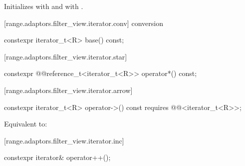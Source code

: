 \begin{itemdescr}
\pnum
\effects Initializes  with  and 
with .
\end{itemdescr}

[range.adaptors.filter_view.iterator.conv]{ conversion}

%
\begin{itemdecl}
constexpr iterator_t<R> base() const;
\end{itemdecl}

\begin{itemdescr}
\pnum
\oldtxt{\returns}  
\end{itemdescr}

[range.adaptors.filter_view.iterator.star]{}

%
\begin{itemdecl}
constexpr @@reference_t<iterator_t<R>> operator*() const;
\end{itemdecl}

\begin{itemdescr}
\pnum
\oldtxt{\returns} 
\end{itemdescr}

{\color{newclr}
[range.adaptors.filter_view.iterator.arrow]{}

%
\begin{itemdecl}
constexpr iterator_t<R> operator->() const
  requires @@<iterator_t<R>>;
\end{itemdecl}

\begin{itemdescr}
\pnum
\effects
Equivalent to: 
\end{itemdescr}
} %

[range.adaptors.filter_view.iterator.inc]{}

%
\begin{itemdecl}
constexpr iterator& operator++();
\end{itemdecl}

